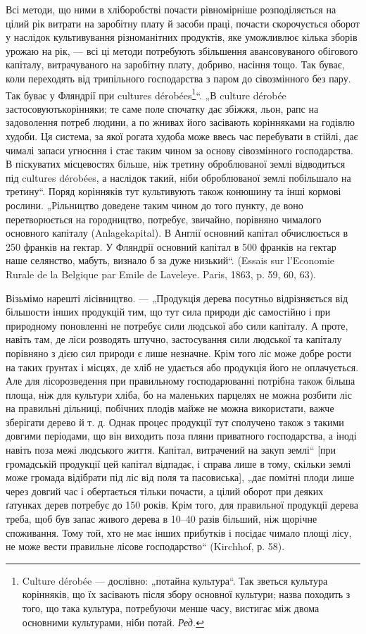 Всі методи, що ними в хліборобстві почасти рівномірніше розподіляється на цілий рік витрати на
заробітну плату й засоби праці, почасти скорочується оборот у наслідок культивування різноманітних
продуктів, яке уможливлює кілька зборів урожаю на рік, — всі ці методи потребують збільшення
авансовуваного обігового капіталу, витрачуваного на заробітну плату, добриво, насіння тощо. Так
буває, коли переходять від трипільного господарства з паром до сівозмінного без пару. Так буває у
Фляндрії при cultures dérobées\footnote*{
Culture dérobée — дослівно: „потайна культура“. Так зветься культура корінняків, що їх засівають
після збору основної культури; назва походить з того, що така культура, потребуючи менше часу,
вистигає між двома основними культурами, ніби потай. \emph{Ред.}
}“. „В culture dérobée застосовуютькорінняки; те саме поле спочатку
дає збіжжя, льон, рапс на задоволення потреб людини,
а по жнивах його засівають корінняками на годівлю худоби. Ця система, за якої рогата худоба
може ввесь час перебувати в стійлі, дає чималі запаси угноєння і стає таким чином за основу
сівозмінного господарства. В піскуватих місцевостях більше, ніж третину оброблюваної землі
відводиться під cultures dérobées, а наслідок такий, ніби оброблюваної землі побільшало на третину“.
Поряд корінняків тут культивують також конюшину та інші кормові рослини. „Рільництво доведене таким
чином до того пункту, де воно перетворюється на городництво, потребує, звичайно, порівняно чималого
основного капіталу (Anlagekapital). В Англії основний капітал обчислюється в 250 франків на гектар.
У Фляндрії основний капітал в 500 франків на гектар наше селянство, мабуть, визнало б за дуже
низький“. (Essais sur l’Economie Rurale de la Belgique par Emile de Laveleye. Paris, 1863, p. 59,
60, 63).

Візьмімо нарешті лісівництво. — „Продукція дерева посутньо відрізняється від більшости інших
продукцій тим, що тут сила природи діє самостійно і при природному поновленні не потребує сили
людської або сили капіталу. А проте, навіть там, де ліси розводять штучно, застосування сили
людської та капіталу порівняно з дією сил природи є лише незначне. Крім того ліс може добре рости на
таких ґрунтах і місцях, де хліб не удається або продукція його не оплачується. Але для
лісорозведення при правильному господарюванні потрібна також більша площа, ніж для культури хліба,
бо на маленьких парцелях не можна розбити ліс на правильні дільниці, побічних плодів майже не можна
використати, важче зберігати дерево й т. д. Однак процес продукції тут сполучено також з такими
довгими періодами, що він виходить поза пляни приватного господарства, а іноді навіть поза межі
людського життя. Капітал,
витрачений на закуп землі“ [при громадській продукції цей капітал відпадає, і справа лише в тому,
скільки землі може громада відібрати під ліс від поля та пасовиська], „дає помітні плоди лише через
довгий час і обертається тільки почасти, а цілий оборот при деяких ґатунках дерев потребує до 150
років. Крім того, для правильної продукції дерева треба, щоб був запас живого дерева в 10–40 разів
більший, ніж щорічне споживання. Тому той, хто не має інших прибутків і посідає чимало площі лісу,
не може вести правильне лісове господарство“ (Kirchhof, р. 58).

